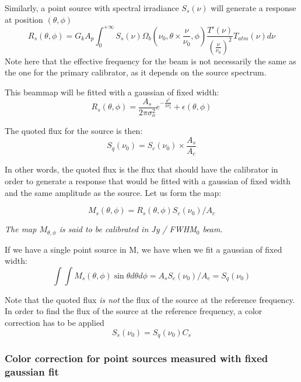 Similarly, a point source with spectral irradiance $S_{s}(\nu)$ will
generate a response at position $(\theta, \phi)$
\begin{equation}
R_{s}(\theta, \phi) =  G_{k} A_{p}  \int_{0}^{+\infty}
S_{s}(\nu) \Omega_{b}(\nu_{0}, \theta \times \frac{\nu}{\nu_{0}},
\phi) \frac{T'(\nu)}{\left(\frac{\nu}{\nu_{0}}\right)^{2}}
T_{atm}(\nu) d\nu
\end{equation}
Note here that the effective frequency for the beam is not necessarily
the same as the one for the primary calibrator, as it depends on the
source spectrum.


This beammap will be fitted with a gaussian of fixed width:
\begin{equation} 
R_{s}(\theta, \phi)  = \frac{A_{s}}{2 \pi \sigma_{o}^{2}}
e^{-\frac{\theta^{2}}{2\sigma_{0}^{2}}}  + \epsilon(\theta, \phi)
\end{equation}

The quoted flux for the source is then:
\begin{equation}
S_{q}(\nu_{0}) =  S_{c} (\nu_{0})  \times \frac{A_{s}}{A_{c}}
\end{equation}

In other words, the quoted flux is the flux that should have the
calibrator in order to generate a response that would be fitted with a
gaussian of fixed width and the same amplitude as the source.
Let us form the map:

\begin{equation}
M_{s}(\theta, \phi) = R_{s}(\theta, \phi)   S_{c} (\nu_{0}) / A_{c}
\end{equation}

 {\em The map $M_{\theta, \phi}$ is said to be calibrated in Jy / FWHM$_{0}$ beam.}

If we have a single point source in M, we have when we fit a gaussian
of fixed width:
\begin{equation}
\int \int M_{s}(\theta, \phi) \sin \theta d\theta d\phi = A_{s}  S_{c} (\nu_{0}) /
A_{c} = S_{q}(\nu_{0})
\end{equation}


Note that the quoted flux {\em is not} the flux of the source at the
reference frequency. In order to find the flux of the source at the
reference frequency, a color correction has to be applied
\begin{equation}
S_{s}(\nu_{0}) = S_{q}(\nu_{0})  C_{s}
\end{equation}

\subsubsection{Color correction for point sources measured with fixed
  gaussian fit}


